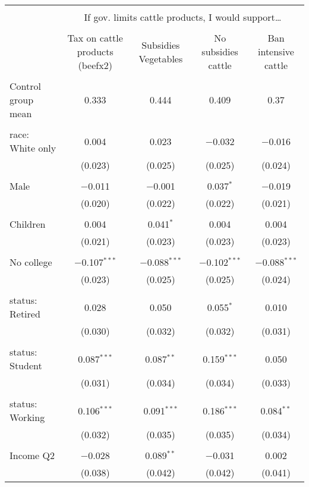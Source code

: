 
\begin{tabular}{@{\extracolsep{5pt}}lcccc} 
\\[-1.8ex]\hline 
\hline \\[-1.8ex] 
 & \multicolumn{4}{c}{If gov. limits cattle products, I would support…} \\ 
\cline{2-5} 
\\[-1.8ex] & Tax on cattle products (beefx2) & Subsidies Vegetables & No subsidies cattle & Ban intensive cattle \\ 
\hline \\[-1.8ex] 
 Control group mean & 0.333 & 0.444 & 0.409 & 0.37  \\ \hline \\[-1.8ex] race: White only & 0.004 & 0.023 & $-$0.032 & $-$0.016 \\ 
  & (0.023) & (0.025) & (0.025) & (0.024) \\ 
  & & & & \\ 
 Male & $-$0.011 & $-$0.001 & 0.037$^{*}$ & $-$0.019 \\ 
  & (0.020) & (0.022) & (0.022) & (0.021) \\ 
  & & & & \\ 
 Children & 0.004 & 0.041$^{*}$ & 0.004 & 0.004 \\ 
  & (0.021) & (0.023) & (0.023) & (0.023) \\ 
  & & & & \\ 
 No college & $-$0.107$^{***}$ & $-$0.088$^{***}$ & $-$0.102$^{***}$ & $-$0.088$^{***}$ \\ 
  & (0.023) & (0.025) & (0.025) & (0.024) \\ 
  & & & & \\ 
 status: Retired & 0.028 & 0.050 & 0.055$^{*}$ & 0.010 \\ 
  & (0.030) & (0.032) & (0.032) & (0.031) \\ 
  & & & & \\ 
 status: Student & 0.087$^{***}$ & 0.087$^{**}$ & 0.159$^{***}$ & 0.050 \\ 
  & (0.031) & (0.034) & (0.034) & (0.033) \\ 
  & & & & \\ 
 status: Working & 0.106$^{***}$ & 0.091$^{***}$ & 0.186$^{***}$ & 0.084$^{**}$ \\ 
  & (0.032) & (0.035) & (0.035) & (0.034) \\ 
  & & & & \\ 
 Income Q2 & $-$0.028 & 0.089$^{**}$ & $-$0.031 & 0.002 \\ 
  & (0.038) & (0.042) & (0.042) & (0.041) \\ 

\end{tabular}
